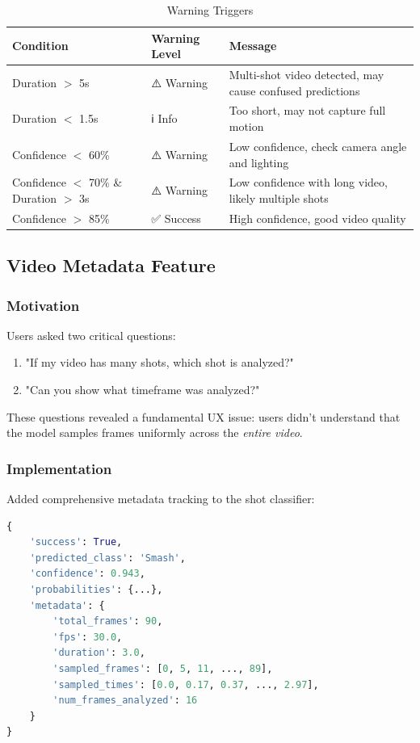 \documentclass[12pt,a4paper]{article}
\begin{document}
\begin{table}[H]
\centering
\caption{Warning Triggers}
\begin{tabular}{llp{6cm}}
\toprule
Condition & Warning Level & Message \\
\midrule
Duration $>$ 5s & ⚠️ Warning & Multi-shot video detected, may cause confused predictions \\
Duration $<$ 1.5s & ℹ️ Info & Too short, may not capture full motion \\
Confidence $<$ 60\% & ⚠️ Warning & Low confidence, check camera angle and lighting \\
Confidence $<$ 70\% \& Duration $>$ 3s & ⚠️ Warning & Low confidence with long video, likely multiple shots \\
Confidence $>$ 85\% & ✅ Success & High confidence, good video quality \\
\bottomrule
\end{tabular}
\end{table}

\subsection{Video Metadata Feature}

\subsubsection{Motivation}

Users asked two critical questions:
\begin{enumerate}
\item "If my video has many shots, which shot is analyzed?"
\item "Can you show what timeframe was analyzed?"
\end{enumerate}

These questions revealed a fundamental UX issue: users didn't understand that the model samples frames uniformly across the \textit{entire video}.

\subsubsection{Implementation}

Added comprehensive metadata tracking to the shot classifier:

\begin{lstlisting}[language=Python, caption=Metadata Return Format]
{
    'success': True,
    'predicted_class': 'Smash',
    'confidence': 0.943,
    'probabilities': {...},
    'metadata': {
        'total_frames': 90,
        'fps': 30.0,
        'duration': 3.0,
        'sampled_frames': [0, 5, 11, ..., 89],
        'sampled_times': [0.0, 0.17, 0.37, ..., 2.97],
        'num_frames_analyzed': 16
    }
}
\end{lstlisting}
\end{document}
